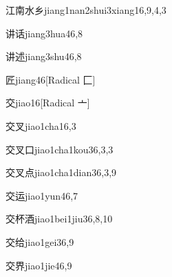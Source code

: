 \begin{verbete}{江南水乡}{jiang1nan2shui3xiang1}{6,9,4,3}
\end{verbete}

\begin{verbete}{讲话}{jiang3hua4}{6,8}
\end{verbete}

\begin{verbete}{讲述}{jiang3shu4}{6,8}
\end{verbete}

\begin{verbete}{匠}{jiang4}{6}[Radical 匚]
\end{verbete}

\begin{verbete}{交}{jiao1}{6}[Radical 亠]
\end{verbete}

\begin{verbete}{交叉}{jiao1cha1}{6,3}
\end{verbete}

\begin{verbete}{交叉口}{jiao1cha1kou3}{6,3,3}
\end{verbete}

\begin{verbete}{交叉点}{jiao1cha1dian3}{6,3,9}
\end{verbete}

\begin{verbete}{交运}{jiao1yun4}{6,7}
\end{verbete}

\begin{verbete}{交杯酒}{jiao1bei1jiu3}{6,8,10}
\end{verbete}

\begin{verbete}{交给}{jiao1gei3}{6,9}
\end{verbete}

\begin{verbete}{交界}{jiao1jie4}{6,9}
\end{verbete}

